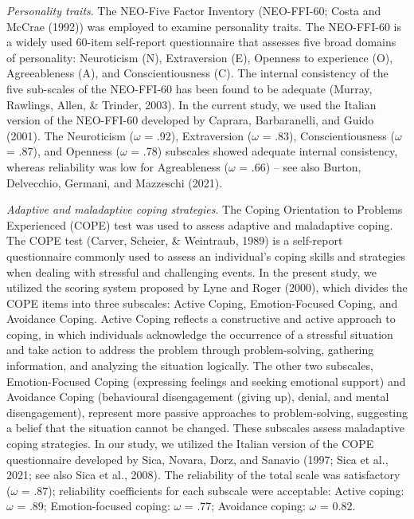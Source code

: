 \documentclass[
  man]{apa7}
\begin{document}
\emph{Personality traits}. The NEO-Five Factor Inventory (NEO-FFI-60; Costa and McCrae (1992)) was employed to examine personality traits. The NEO-FFI-60 is a widely used 60-item self-report questionnaire that assesses five broad domains of personality: Neuroticism (N), Extraversion (E), Openness to experience (O), Agreeableness (A), and Conscientiousness (C). The internal consistency of the five sub-scales of the NEO-FFI-60 has been found to be adequate (Murray, Rawlings, Allen, \& Trinder, 2003). In the current study, we used the Italian version of the NEO-FFI-60 developed by Caprara, Barbaranelli, and Guido (2001). The Neuroticism (\(\omega\) = .92), Extraversion (\(\omega\) = .83), Conscientiousness (\(\omega\) = .87), and Openness (\(\omega\) = .78) subscales showed adequate internal consistency, whereas reliability was low for Agreableness (\(\omega\) = .66) -- see also Burton, Delvecchio, Germani, and Mazzeschi (2021).

\emph{Adaptive and maladaptive coping strategies}. The Coping Orientation to Problems Experienced (COPE) test was used to assess adaptive and maladaptive coping. The COPE test (Carver, Scheier, \& Weintraub, 1989) is a self-report questionnaire commonly used to assess an individual's coping skills and strategies when dealing with stressful and challenging events. In the present study, we utilized the scoring system proposed by Lyne and Roger (2000), which divides the COPE items into three subscales: Active Coping, Emotion-Focused Coping, and Avoidance Coping. Active Coping reflects a constructive and active approach to coping, in which individuals acknowledge the occurrence of a stressful situation and take action to address the problem through problem-solving, gathering information, and analyzing the situation logically. The other two subscales, Emotion-Focused Coping (expressing feelings and seeking emotional support) and Avoidance Coping (behavioural disengagement (giving up), denial, and mental disengagement), represent more passive approaches to problem-solving, suggesting a belief that the situation cannot be changed. These subscales assess maladaptive coping strategies. In our study, we utilized the Italian version of the COPE questionnaire developed by Sica, Novara, Dorz, and Sanavio (1997; Sica et al., 2021; see also Sica et al., 2008). The reliability of the total scale was satisfactory (\(\omega\) = .87); reliability coefficients for each subscale were acceptable: Active coping: \(\omega\) = .89; Emotion-focused coping: \(\omega\) = .77; Avoidance coping: \(\omega\) = 0.82.
\end{document}
